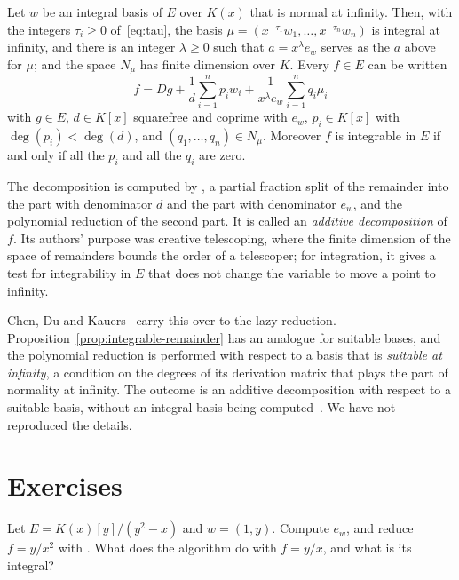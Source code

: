 \begin{theorem}\label{thm:additive}
Let $w$ be an integral basis of $E$ over $K(x)$ that is normal at infinity.
Then, with the integers $\tau_i \ge 0$ of~\eqref{eq:tau}, the basis $\mu =
(x^{-\tau_1} w_1, \dots, x^{-\tau_n} w_n)$ is integral at infinity, and there
is an integer $\lambda \ge 0$ such that $a = x^\lambda e_w$ serves as the $a$ above
for $\mu$; and the space $N_\mu$ has finite dimension over $K$. Every $f \in
E$ can be written
\[
  f = Dg + \frac{1}{d} \sum_{i=1}^n p_i w_i
         + \frac{1}{x^\lambda e_w} \sum_{i=1}^n q_i \mu_i
\]
with $g \in E$, $d \in K[x]$ squarefree and coprime with $e_w$, $p_i \in K[x]$
with $\deg(p_i) < \deg(d)$, and $(q_1, \dots, q_n) \in N_\mu$. Moreover $f$ is
integrable in $E$ if and only if all the $p_i$ and all the $q_i$ are zero.
\end{theorem}

The decomposition is computed by , a partial fraction
split of the remainder into the part with denominator $d$ and the part with
denominator $e_w$, and the polynomial reduction of the second part. It is
called an \emph{additive decomposition} of $f$. Its authors' purpose was
creative telescoping, where the finite dimension of the space of remainders
bounds the order of a telescoper; for integration, it gives a test for
integrability in $E$ that does not change the variable to move a point to
infinity.

Chen, Du and Kauers~\cite{chen2021} carry this over to the lazy reduction.
Proposition~\ref{prop:integrable-remainder} has an analogue for suitable
bases, and the polynomial reduction is performed with respect to a basis
that is \emph{suitable at infinity}, a condition on the degrees of its
derivation matrix that plays the part of normality at infinity. The outcome
is an additive decomposition with respect to a suitable basis, without an
integral basis being computed~\cite[Theorem~16]{chen2021}. We have not
reproduced the details.

\section*{Exercises}

\begin{exercise}
Let $E = K(x)[y]/(y^2 - x)$ and $w = (1, y)$. Compute $e_w$, and reduce $f =
y/x^2$ with . What does the algorithm do with $f =
y/x$, and what is its integral?
\end{exercise}

